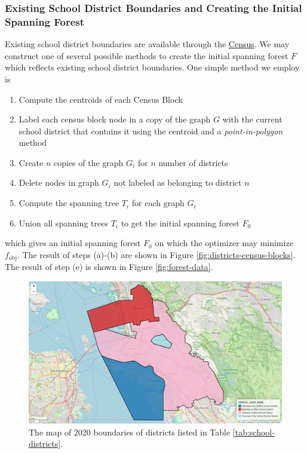 \documentclass{article}
\begin{document}

\subsubsection*{Existing School District Boundaries and Creating the Initial Spanning Forest}
Existing school district boundaries are available through the \href{https://www2.census.gov/geo/tiger/TGRGDB20/tlgdb_2020_a_us_school.gdb.zip}{Census}. We may construct one of  several possible methods to create the initial spanning forest \(F\) which reflects existing school district boundaries. One simple method we employ is
\begin{enumerate}[label=(\alph*)]
    \item Compute the centroids of each Census Block
    \item Label each census block node in a copy of the graph \(G\) with the current school district that contains it using the centroid and a \textit{point-in-polygon} method
    \item Create \(n\) copies of the graph \(G_i\) for \(n\) number of districts
    \item Delete nodes in graph \(G_i\) not labeled as belonging to district \(n\)
    \item Compute the spanning tree \(T_i\) for each graph \(G_i\)
    \item Union all spanning trees \(T_i\) to get the initial spanning forest \(F_0\)
\end{enumerate}
which gives an initial spanning forest \(F_0\) on which the optimizer may minimize \(f_{\text{obj}}\). The result of steps (a)-(b) are shown in Figure \ref{fig:districts-census-blocks}. The result of step (e) is shown in Figure \ref{fig:forest-data}.

\begin{figure}[H]
    \centering
    \includegraphics[width=\textwidth]{figure/districts.png}
    \caption{The map of 2020 boundaries of districts listed in Table \ref{tab:school-districts}.}
    \label{fig:districts}
\end{figure}
\end{document}
